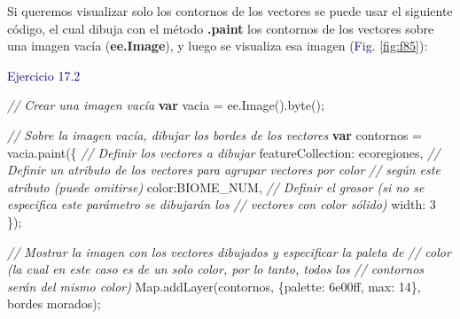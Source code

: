 \documentclass[
  12pt,
  letterpaper,
  twoside]{book}
\newenvironment{Shaded}{\begin{snugshade}}{\end{snugshade}}
\newcommand{\BuiltInTok}[1]{#1}
\newcommand{\CommentTok}[1]{\textcolor[rgb]{0.24,0.58,0.00}{\textit{#1}}}
\newcommand{\DataTypeTok}[1]{\textcolor[rgb]{0.00,0.00,0.00}{#1}}
\newcommand{\DecValTok}[1]{\textcolor[rgb]{0.28,0.53,0.93}{#1}}
\newcommand{\FunctionTok}[1]{\textcolor[rgb]{0.48,0.12,0.64}{#1}}
\newcommand{\KeywordTok}[1]{\textcolor[rgb]{0.00,0.00,0.00}{\textbf{#1}}}
\newcommand{\NormalTok}[1]{#1}
\newcommand{\OperatorTok}[1]{\textcolor[rgb]{0.00,0.00,0.00}{#1}}
\newcommand{\StringTok}[1]{\textcolor[rgb]{0.87,0.29,0.22}{#1}}
\newcommand\boldpurple[1]{\textcolor{darkpurple}{\textbf{#1}}}
\begin{document}
Si queremos visualizar solo los contornos de los vectores se puede usar el siguiente código, el cual dibuja con el método \boldpurple{.paint} los contornos de los vectores sobre una imagen vacía (\boldpurple{ee.Image}), y luego se visualiza esa imagen (\textcolor{darkblue}{Fig.} \ref{fig:f85}):

\textcolor{darkblue}{Ejercicio 17.2}

\begin{Shaded}
\begin{Highlighting}[]
\CommentTok{// Crear una imagen vacía}
\KeywordTok{var}\NormalTok{ vacia }\OperatorTok{=}\NormalTok{ ee}\OperatorTok{.}\FunctionTok{Image}\NormalTok{()}\OperatorTok{.}\FunctionTok{byte}\NormalTok{()}\OperatorTok{;}

\CommentTok{// Sobre la imagen vacía, dibujar los bordes de los vectores}
\KeywordTok{var}\NormalTok{ contornos }\OperatorTok{=}\NormalTok{ vacia}\OperatorTok{.}\FunctionTok{paint}\NormalTok{(\{}
  \CommentTok{// Definir los vectores a dibujar}
  \DataTypeTok{featureCollection}\OperatorTok{:}\NormalTok{ ecoregiones}\OperatorTok{,}  
  \CommentTok{// Definir un atributo de los vectores para agrupar vectores por color }
  \CommentTok{// según este atributo (puede omitirse)}
  \DataTypeTok{color}\OperatorTok{:}\StringTok{\textquotesingle{}BIOME\_NUM\textquotesingle{}}\OperatorTok{,}  
  \CommentTok{// Definir el grosor (si no se especifica este parámetro se dibujarán los   }
  \CommentTok{// vectores con color sólido)       }
  \DataTypeTok{width}\OperatorTok{:} \DecValTok{3}                          
\NormalTok{\})}\OperatorTok{;}

\CommentTok{// Mostrar la imagen con los vectores dibujados y especificar la paleta de}
\CommentTok{// color (la cual en este caso es de un solo color, por lo tanto, todos los}
\CommentTok{// contornos serán del mismo color)}
\BuiltInTok{Map}\OperatorTok{.}\FunctionTok{addLayer}\NormalTok{(contornos}\OperatorTok{,}\NormalTok{ \{}\DataTypeTok{palette}\OperatorTok{:} \StringTok{\textquotesingle{}6e00ff\textquotesingle{}}\OperatorTok{,} \DataTypeTok{max}\OperatorTok{:} \DecValTok{14}\NormalTok{\}}\OperatorTok{,} 
  \StringTok{\textquotesingle{}bordes morados\textquotesingle{}}\NormalTok{)}\OperatorTok{;} 


\end{Highlighting}
\end{Shaded}
\end{document}
